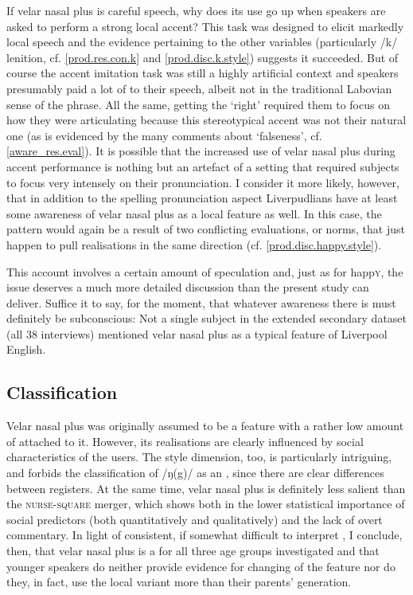 If velar nasal plus is careful speech, why does its use go up when speakers are asked to perform a strong local accent?
This task was designed to elicit markedly local speech and the evidence pertaining to the other variables (particularly /k/ lenition, cf. \ref{prod.res.con.k} and \ref{prod.disc.k.style}) suggests it succeeded.
But of course the accent imitation task was still a highly artificial context and speakers presumably paid a lot of  to their speech, albeit not in the traditional Labovian sense of the phrase.
All the same, getting the  `right' required them to focus on how they were articulating because this stereotypical accent was not their natural one (as is evidenced by the many comments about `falseness', cf. \ref{aware_res.eval}).
It is possible that the increased use of velar nasal plus during accent performance is nothing but an artefact of a setting that required subjects to focus very intensely on their pronunciation.
I consider it more likely, however, that in addition to the spelling pronunciation aspect Liverpudlians have at least some awareness of velar nasal plus as a local feature as well.
In this case, the  pattern would again be a result of two conflicting evaluations, or norms, that just happen to pull realisations in the same direction (cf. \ref{prod.disc.happy.style}).

This account involves a certain amount of speculation and, just as for happ\textsc{y}, the issue deserves a much more detailed discussion than the present study can deliver.
Suffice it to say, for the moment, that whatever awareness there is must definitely be subconscious: Not a single subject in the extended secondary dataset (all 38 interviews) mentioned velar nasal plus as a typical feature of Liverpool English.

\subsection{Classification}
\label{prod.disc.ng.classification}

Velar nasal plus was originally assumed to be a feature with a rather low amount of  attached to it.
However, its realisations are clearly influenced by social characteristics of the users.
The style dimension, too, is particularly intriguing, and forbids the classification of /ŋ(g)/ as an , since there are clear differences between registers.
At the same time, velar nasal plus is definitely less salient than the \textsc{nurse}-\textsc{square} merger, which shows both in the lower statistical importance of social predictors (both quantitatively and qualitatively) and the lack of overt commentary.
In light of consistent, if somewhat difficult to interpret , I conclude, then, that velar nasal plus is a  for all three age groups investigated and that younger speakers do neither provide evidence for changing  of the feature nor do they, in fact, use the local variant more than their parents' generation.

